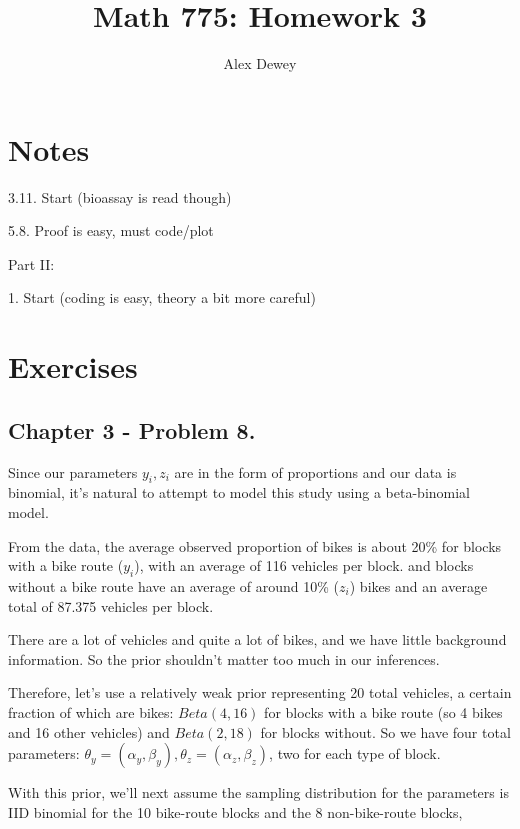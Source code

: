 \documentclass{article}
\begin{document}
\title{Math 775: Homework 3}
\author{Alex Dewey}


\maketitle

\section{Notes}

3.11. Start (bioassay is read though)

5.8. Proof is easy, must code/plot

Part II:

1. Start (coding is easy, theory a bit more careful)


\section{Exercises}

\subsection{Chapter 3 - Problem 8.}

Since our parameters \(y_i, z_i\) are in the form of proportions
and our data is binomial, it's natural to attempt to model this study 
using a beta-binomial model.

From the data, the average observed proportion of bikes is about 20\% for
blocks with a bike route  (\(y_i\)), with an average of 116 vehicles per block.
and blocks without a bike route have an average of around 10\% (\(z_i\)) bikes
and an average total of 87.375 vehicles per block.

There are a lot of vehicles and quite a lot of bikes, and we have little
background information. So the prior shouldn't matter too much in our inferences.

Therefore, let's use a relatively weak prior representing 20 total vehicles,
a certain fraction of which are bikes:
\(Beta(4, 16)\) for blocks with a bike route (so 4 bikes and 16 other vehicles) and 
\(Beta(2, 18)\) for blocks without. So we have four total parameters: 
\(\theta_y = (\alpha_y, \beta_y), \theta_z = (\alpha_z, \beta_z)\), two for each type of block.

With this prior, we'll next assume the sampling distribution for the parameters
is IID binomial for the 10 bike-route blocks and the 8 non-bike-route blocks,
\end{document}
